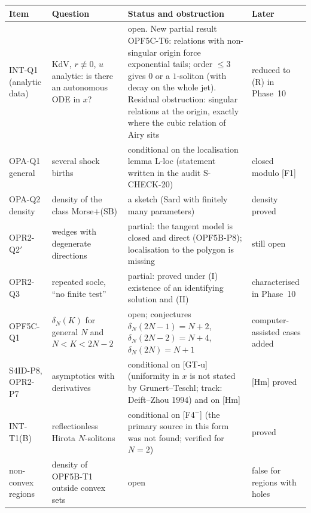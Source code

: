 \begin{center}\small
\begin{longtable}{@{}L{2.6cm}L{3.6cm}L{5.2cm}L{3.0cm}@{}}
\toprule
Item & Question & Status and obstruction & Later\\\midrule\endhead
INT-Q1 (analytic data) & KdV, $r\not\equiv0$, $u$ analytic: is there an autonomous ODE in $x$? & open. New partial result OPF5C-T6: relations with non-singular origin force exponential tails; order $\le3$ gives $0$ or a $1$-soliton (with decay on the whole jet). Residual obstruction: singular relations at the origin, exactly where the cubic relation of Airy sits & reduced to (R) in Phase~10\\
OPA-Q1 general & several shock births & conditional on the localisation lemma L-loc (statement written in the audit S-CHECK-20) & closed modulo [F1]\\
OPA-Q2 density & density of the class Morse$+$(SB) & a sketch (Sard with finitely many parameters) & density proved\\
OPR2-Q2$'$ & wedges with degenerate directions & partial: the tangent model is closed and direct (OPF5B-P8); localisation to the polygon is missing & still open\\
OPR2-Q3 & repeated socle, ``no finite test'' & partial: proved under (I) existence of an identifying solution and (II) & characterised in Phase~10\\
OPF5C-Q1 & $\delta_N(K)$ for general $N$ and $N<K<2N-2$ & open; conjectures $\delta_N(2N-1)=N+2$, $\delta_N(2N-2)=N+4$, $\delta_N(2N)=N+1$ & computer-assisted cases added\\
S4ID-P8, OPR2-P7 & asymptotics with derivatives & conditional on [GT-u] (uniformity in $x$ is not stated by Grunert--Teschl; track: Deift--Zhou 1994) and on [Hm] & [Hm] proved\\
INT-T1(B) & reflectionless Hirota $N$-solitons & conditional on [F4$^-$] (the primary source in this form was not found; verified for $N=2$) & proved\\
non-convex regions & density of OPF5B-T1 outside convex sets & open & false for regions with holes\\
\bottomrule
\end{longtable}
\end{center}

